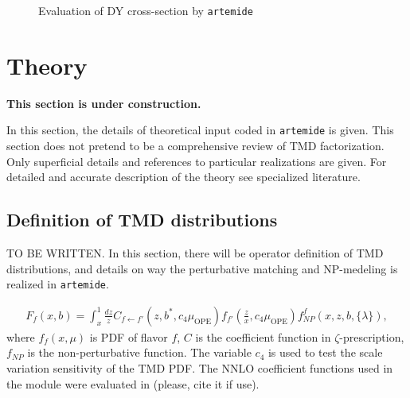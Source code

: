 \documentclass[prd,nofootinbib,eqsecnum,final]{revtex4}
\newcommand{\ot}{\leftarrow}
\renewcommand{\(}{\left(}
\renewcommand{\)}{\right)}
\renewcommand{\[}{\left[}
\renewcommand{\]}{\right]}
\newcommand{\red}[1]{{\color[rgb]{1,0,0} #1}}
\begin{document}
\begin{figure}
\begin{center}
\end{center}
\caption{\label{fig:order_of_evaluation} {\Large Evaluation of DY cross-section by \texttt{artemide}}}
\end{figure}

\newpage

\section{Theory}

\begin{center}
\red{\textbf{This section is under construction.}}
\end{center}

In this section, the details of theoretical input coded in \texttt{artemide} is given. This section does not pretend to be a comprehensive review of TMD factorization. Only superficial details and references to particular realizations are given. For detailed and accurate description of the theory see specialized literature.

\subsection{Definition of TMD distributions}

\red{TO BE WRITTEN}. In this section, there will be operator definition of TMD distributions, and details on way the perturbative matching and NP-medeling is realized in \texttt{artemide}.

\begin{eqnarray}
F_f(x,b)=\int_x^1 \frac{dz}{z}C_{f\ot f'}(z,b^*,c_4\mu_\text{OPE})f_{f'}(\frac{z}{x},c_4\mu_\text{OPE})f^f_{NP}(x,z,b,\{\lambda\}),
\end{eqnarray}
where $f_f(x,\mu)$ is PDF of flavor $f$, $C$ is the coefficient function in $\zeta$-prescription, $f_{NP}$ is the non-perturbative function. The variable $c_4$ is used to test the scale variation sensitivity of the TMD PDF. The NNLO coefficient functions used in the module were evaluated in \cite{Echevarria:2016scs} (please, cite it if use).
\end{document}
